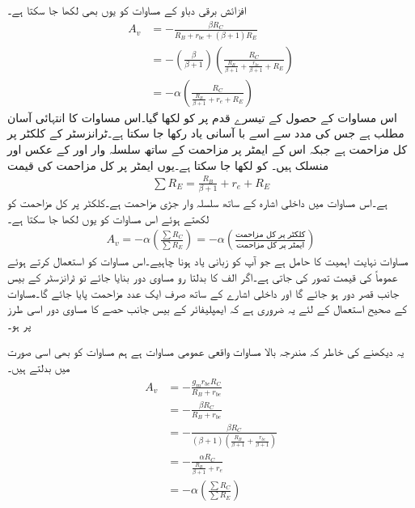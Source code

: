افزائش برقی دباو کے مساوات کو یوں بھی لکھا جا سکتا ہے۔
\begin{align*}
A_v&=-\frac{\beta R_C}{R_B+r_{be}+\left(\beta+1 \right )R_E}\\
&=-\left(\frac{\beta}{\beta+1} \right) \left (\frac{R_C}{\frac{R_B}{\beta+1}+\frac{r_{be}}{\beta+1}+R_E} \right )\\
&=-\alpha \left(\frac{R_C}{\frac{R_B}{\beta+1}+r_e+R_E} \right )
\end{align*}
اس مساوات کے حصول کے تیسرے قدم پر  کو  لکھا گیا۔اس مساوات کا انتہائی آسان مطلب ہے جس کی مدد سے اسے با آسانی یاد رکھا جا سکتا ہے۔ٹرانزسٹر کے کلکٹر  پر کل مزاحمت  ہے جبکہ اس کے ایمٹر پر مزاحمت  کے ساتھ سلسلہ وار  اور  کے عکس   اور  منسلک ہیں۔  کو   لکھا جا سکتا ہے۔یوں ایمٹر پر کل مزاحمت   کی قیمت 
\begin{align*}
\sum {R_E}=\frac{R_B}{\beta+1}+r_e+R_E
\end{align*}
ہے۔اس مساوات میں  داخلی اشارہ  کے ساتھ سلسلہ وار جڑی مزاحمت ہے۔کلکٹر  پر کل مزاحمت کو  لکھتے ہوئے اس مساوات کو یوں لکھا جا سکتا ہے۔
\begin{align} \label{مساوات_ٹرانزسٹر_ایمپلیفائر_کی_افزائش_کلکٹر _مخارج_مزاحمتوں_کی_شرح}
A_v = - \alpha \left(\frac{\sum{R_C}}{\sum{R_E}} \right )=-\alpha \left(\frac{\textrm {کلکٹر پر کل مزاحمت}}{\textrm{ایمٹر پر کل مزاحمت}} \right )
\end{align}
مساوات   نہایت اہمیت کا حامل ہے جو آپ کو زبانی یاد ہونا چاہیے۔اس مساوات کو استعمال کرتے ہوئے عموماً  کی قیمت  تصور کی جاتی ہے۔اگر  الف کا بدلتا رو مساوی دور بنایا جائے تو ٹرانزسٹر کے بیس جانب  قصر دور ہو جائے گا اور داخلی اشارے  کے ساتھ صرف ایک عدد مزاحمت  پایا جائے گا۔مساوات  کے صحیح استعمال کے لئے یہ ضروری ہے کہ ایمپلیفائر کے بیس جانب حصے کا مساوی دور اسی طرز پر ہو۔  

یہ دیکھنے کی خاطر کہ مندرجہ بالا مساوات واقعی عمومی مساوات ہے ہم مساوات  کو بھی اسی صورت میں بدلتے ہیں۔
\begin{align*}
A_v&=-\frac{g_m r_{be} R_C}{R_B+r_{be}}\\
&=-\frac{\beta R_C}{R_B+r_{be}}\\
&=-\frac{\beta R_C}{\left(\beta+1 \right ) \left(\frac{R_B}{\beta+1}+\frac{r_{be}}{\beta+1} \right )}\\
&=-\frac{\alpha R_C}{\frac{R_B}{\beta+1}+r_e}\\
&=-\alpha \left(\frac{\sum R_C}{\sum R_E} \right )
\end{align*}


